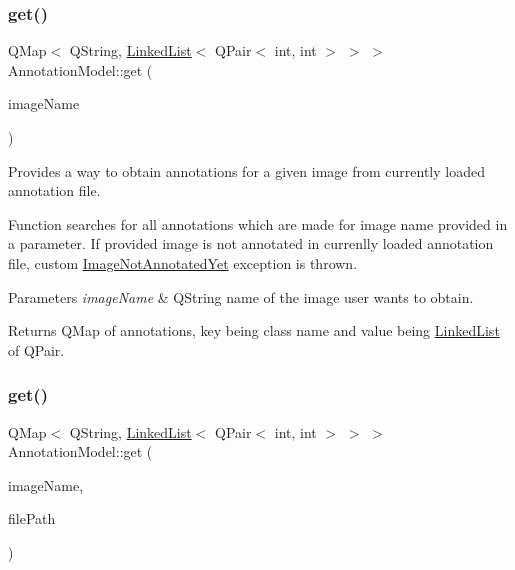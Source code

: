 \subsubsection{\texorpdfstring{get()}{get()}\hspace{0.1cm}{\footnotesize\ttfamily [1/2]}}
{\footnotesize\ttfamily Q\+Map$<$ Q\+String, \hyperlink{classLinkedList}{Linked\+List}$<$ Q\+Pair$<$ int, int $>$ $>$ $>$ Annotation\+Model\+::get (\begin{DoxyParamCaption}\item[{const Q\+String \&}]{image\+Name }\end{DoxyParamCaption})}



Provides a way to obtain annotations for a given image from currently loaded annotation file. 

Function searches for all annotations which are made for image name provided in a parameter. If provided image is not annotated in currenlly loaded annotation file, custom \hyperlink{classImageNotAnnotatedYet}{Image\+Not\+Annotated\+Yet} exception is thrown.


\begin{DoxyParams}{Parameters}
{\em image\+Name} & Q\+String name of the image user wants to obtain. \\
\hline
\end{DoxyParams}
\begin{DoxyReturn}{Returns}
Q\+Map of annotations, key being class name and value being \hyperlink{classLinkedList}{Linked\+List} of Q\+Pair. 
\end{DoxyReturn}
\mbox{\label{classAnnotationModel_afed52e5d48da396919f02ed88c94921a}} 
\subsubsection{\texorpdfstring{get()}{get()}\hspace{0.1cm}{\footnotesize\ttfamily [2/2]}}
{\footnotesize\ttfamily Q\+Map$<$ Q\+String, \hyperlink{classLinkedList}{Linked\+List}$<$ Q\+Pair$<$ int, int $>$ $>$ $>$ Annotation\+Model\+::get (\begin{DoxyParamCaption}\item[{const Q\+String \&}]{image\+Name,  }\item[{const Q\+String \&}]{file\+Path }\end{DoxyParamCaption})}



